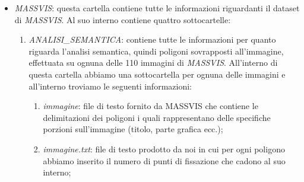 \documentclass[%
	corpo=12pt,
    twoside,
    stile=classica,
    oldstyle,
    tipotesi=custom,
    greek,
    evenboxes,
]{toptesi}
\begin{document}
{\begin{itemize}
\begin{enumerate}
\begin{enumerate}
		\item \textit{IMAGE\_HEAT\_MAP\_62\_graph}: è l’immagine originale con sovrapposta la mappa di calore generata da tutti i punti di fissazione;
		\item \textit{ITTI\_graph}: è quello che l’algoritmo di Itti modificato genera;
		\item \textit{ITTI\_OR\_graph}: è quello che l’algoritmo di Itti originale genera;
		\item \textit{mySalience\_graph}: è l’immagine originale con sovrapposta la mappa di calore generata da Matzen;
		\item una cartella \textit{oss} per ognuno dei 62 osservatori che sono stati sottoposti all’esperimento: in ognuna di queste cartelle è contenuto il file di testo \textit{subject…} che contiene tuti i punti di fissazione per quel determinato osservatore su quell’immagine, mentre il file excel \textit{Cartel1} è la conversione in formato di tabella del file di testo precedente in maniera tale che sia agile importarlo in Matlab;
		\item \textit{TextSaliency\_graph}: è quello che viene generato solo dall’analisi del testo;
		\end{enumerate}
	\item \textit{ORIGINALI}: contiene tutte e 30 le immagini usate per l’esperimento così come sono state create originariamente, da \textit{\“graph0\”} a \textit{\“graph29\”}.
	\end{enumerate}
\item \textit{MASSVIS}: questa cartella contiene tutte le informazioni riguardanti il dataset di \textit{MASSVIS}. Al suo interno contiene quattro sottocartelle:
	\begin{enumerate}
	\item \textit{ANALISI\_SEMANTICA}: contiene tutte le informazioni per quanto riguarda l’analisi semantica, quindi poligoni sovrapposti all’immagine, effettuata su ognuna delle 110 immagini di \textit{MASSVIS}. All’interno di 	questa cartella abbiamo una sottocartella per ognuna delle immagini e all’interno troviamo le seguenti informazioni:
		\begin{enumerate}
		\item \textit{immagine}: file di testo fornito da MASSVIS che contiene le delimitazioni dei poligoni i quali rappresentano delle specifiche porzioni sull’immagine (titolo, parte grafica ecc.);
		\item \textit{immagine.txt}: file di testo prodotto da noi in cui per ogni poligono abbiamo inserito il numero di punti di fissazione che cadono al suo interno;

\end{enumerate}
\end{enumerate}
\end{itemize}}
\end{document}
